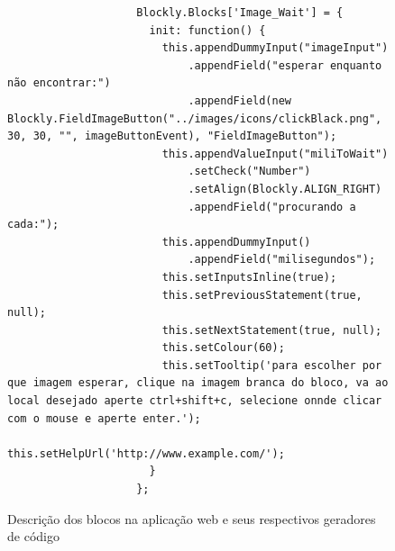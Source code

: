 \documentclass[tg]{mdtufsm}
\begin{document}
\begin{figure}[!htb]
\begin{lstlisting}
                    Blockly.Blocks['Image_Wait'] = {
                      init: function() {
                        this.appendDummyInput("imageInput")
                            .appendField("esperar enquanto não encontrar:")
                            .appendField(new Blockly.FieldImageButton("../images/icons/clickBlack.png", 30, 30, "", imageButtonEvent), "FieldImageButton");
                        this.appendValueInput("miliToWait")
                            .setCheck("Number")
                            .setAlign(Blockly.ALIGN_RIGHT)
                            .appendField("procurando a cada:");
                        this.appendDummyInput()
                            .appendField("milisegundos");
                        this.setInputsInline(true);
                        this.setPreviousStatement(true, null);
                        this.setNextStatement(true, null);
                        this.setColour(60);
                        this.setTooltip('para escolher por que imagem esperar, clique na imagem branca do bloco, va ao local desejado aperte ctrl+shift+c, selecione onnde clicar com o mouse e aperte enter.');
                        this.setHelpUrl('http://www.example.com/');
                      }
                    };
                \end{lstlisting}
                    \caption{Descrição dos blocos na aplicação web e seus respectivos geradores de código}
                    \label{code:myBlocks.js}
                \end{figure}
\end{document}

